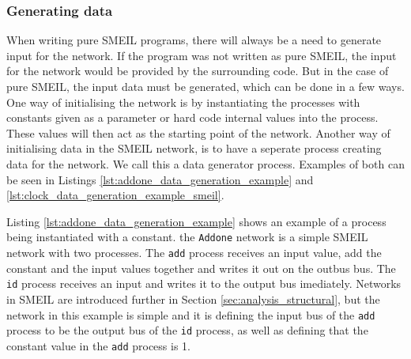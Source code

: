 \subsubsection{Generating data}
When writing pure SMEIL programs, there will always be a need to generate input for the network. If the program was not written as pure SMEIL, the input for the network would be provided by the surrounding code. But in the case of pure SMEIL, the input data must be generated, which can be done in a few ways.
One way of initialising the network is by instantiating the processes with constants given as a parameter or hard code internal values into the process. These values will then act as the starting point of the network. Another way of initialising data in the SMEIL network, is to have a seperate process creating data for the network. We call this a data generator process. Examples of both can be seen in Listings \ref{lst:addone_data_generation_example} and \ref{lst:clock_data_generation_example_smeil}.

Listing \ref{lst:addone_data_generation_example} shows an example of a process being instantiated with a constant. the \texttt{Addone} network is a simple SMEIL network with two processes. The \texttt{add} process receives an input value, add the constant and the input values together and writes it out on the outbus bus. The \texttt{id} process receives an input and writes it to the output bus imediately. Networks in SMEIL are introduced further in Section \ref{sec:analysis_structural}, but the network in this example is simple and it is defining the input bus of the \texttt{add} process to be the output bus of the \texttt{id} process, as well as defining that the constant value in the \texttt{add} process is 1. \\

